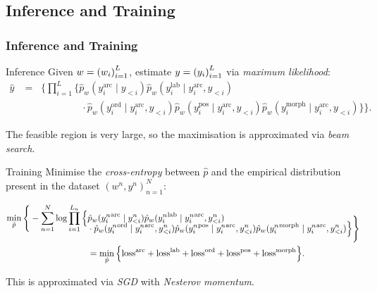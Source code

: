 \documentclass[8pt]{beamer}
\theoremstyle{definition}
\theoremstyle{plain}
\theoremstyle{definition}
\theoremstyle{remark}
\numberwithin{equation}{section}
\numberwithin{figure}{section}
\numberwithin{table}{section}
\begin{document}
\subsection{Inference and Training}
\begin{frame}
    \frametitle{Inference and Training}
    \setlength{\abovedisplayskip}{0pt}
\setlength{\belowdisplayskip}{0pt}
\setlength{\abovedisplayshortskip}{0pt}
\setlength{\belowdisplayshortskip}{0pt}
    \begin{block}{Inference}
        Given \(w=\qty(w_{i})_{i=1}^{L}\), estimate \(y = \qty(y_{i})_{i=1}^{L}\) via \textit{maximum likelihood}:
        \begin{align*}
            \hat{y} &= \mathop{\underset{y}{\operatorname{arg\,max}}} \Bigg\{  \prod_{i=1}^{L} \Big\{ \hat{p}_{w}(y_{i}^{\text{arc}} \mid y_{<i}) \hat{p}_{w}(y_{i}^{\text{lab}} \mid y_{i}^{\text{arc}}, y_{<i}) \\[-2.5em]
            &\phantom{\ = \mathop{\underset{y}{\operatorname{arg\,max}}} \Bigg\{ \prod_{i=1}^{L} \Big\{} \cdot \hat{p}_{w}(y_{i}^{\text{ord}} \mid y_{i}^{\text{arc}}, y_{<i}) \hat{p}_{w}(y_{i}^{\text{pos}} \mid y_{i}^{\text{arc}}, y_{<i}) \hat{p}_{w}(y_{i}^{\text{morph}} \mid y_{i}^{\text{arc}}, y_{<i}) \Big\} \Bigg\}.
        \end{align*}
    \end{block}

    The feasible region is very large, so the maximisation is approximated via \textit{beam search}.

    \begin{block}{Training}
        Minimise the \textit{cross-entropy} between \(\hat{p}\) and the empirical distribution present in the dataset \((w^{n}, y^{n})_{n=1}^{N}\):
        
        \begin{align*}
            \mathop{\underset{\hat{p}}{\min}} \Bigg\{ - \sum_{n=1}^{N} \log \prod_{i=1}^{L_{n}} \Big\{ & \hat{p}_{w}({y_{i}^{n}}^{\text{arc}} \mid y_{<i}^{n}) \hat{p}_{w}({y_{i}^{n}}^{\text{lab}} \mid {y_{i}^{n}}^{\text{arc}}, y_{<i}^{n}) \\[-2.25em]
            & \cdot \hat{p}_{w}({y_{i}^{n}}^{\text{ord}} \mid {y_{i}^{n}}^{\text{arc}}, y_{<i}^{n}) \hat{p}_{w}({y_{i}^{n}}^{\text{pos}} \mid {y_{i}^{n}}^{\text{arc}}, y_{<i}^{n}) \hat{p}_{w}({y_{i}^{n}}^{\text{morph}} \mid {y_{i}^{n}}^{\text{arc}}, y_{<i}^{n}) \Big\} \Bigg\} \\
            &= \mathop{\underset{ \hat{p}}{\min}} \qty{\text{loss}^{\text{arc}} + \text{loss}^{\text{lab}} + \text{loss}^{\text{ord}} + \text{loss}^{\text{pos}} + \text{loss}^{\text{morph}}}.
        \end{align*}
    \end{block}

    This is approximated via \textit{SGD} with \textit{Nesterov momentum}.
\end{frame}
\end{document}
